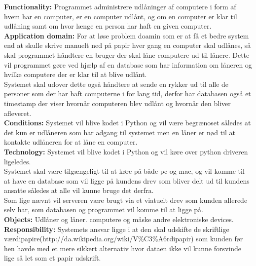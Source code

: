 \documentclass[a4paper]{article}
\begin{document}
\textbf{Functionality:} Programmet administrere udlåninger af computere i form af hvem har en computer, er en computer udlånt, og om en computer er klar til udlåning samt om hvor længe en person har haft en given computer.\\
\textbf{Application domain:} For at løse problem doamin som er at få et bedre system end at skulle skrive manuelt ned på papir hver gang en computer skal udlånes, så skal programmet håndtere en bruger der skal låne computere ud til lånere. Dette vil programmet gøre ved hjælp af en database som har information om låneren og hvilke computere der er klar til at blive udlånt.\\
Systemet skal udover dette også håndtere at sende en rykker ud til alle de personer som der har haft computerne i for lang tid, derfor har databasen også et timestamp der viser hvornår computeren blev udlånt og hvornår den bliver afleveret.\\
\textbf{Conditions:} Systemet vil blive kodet i Python og vil være begrænoset således at det kun er udlåneren som har adgang til systemet men en låner er nød til at kontakte udlåneren for at låne en computer.\\
\textbf{Technology:} Systemet vil blive kodet i Python og vil køre over python driveren ligeledes.\\
Systemet skal være tilgængeligt til at køre på både pc og mac, og vil komme til at have en database som vil ligge på kundens drev som bliver delt ud til kundens ansatte således at alle vil kunne bruge det derfra.\\
Som lige nævnt vil serveren være brugt via et viatuelt drev som kunden allerede selv har, som databasen og programmet vil komme til at ligge på.\\
\textbf{Objects:} Udlåner og låner. computere og måske andre elektroniske devices.\\
\textbf{Responsibility:} Systemets ansvar ligge i at den skal udskifte de skriftlige værdipapire(http://da.wikipedia.org/wiki/V\%C3\%A6rdipapir) som kunden før hen havde med et mere sikkert alternativ hvor dataen ikke vil kunne forsvinde lige så let som et papir udskrift.
\end{document}
